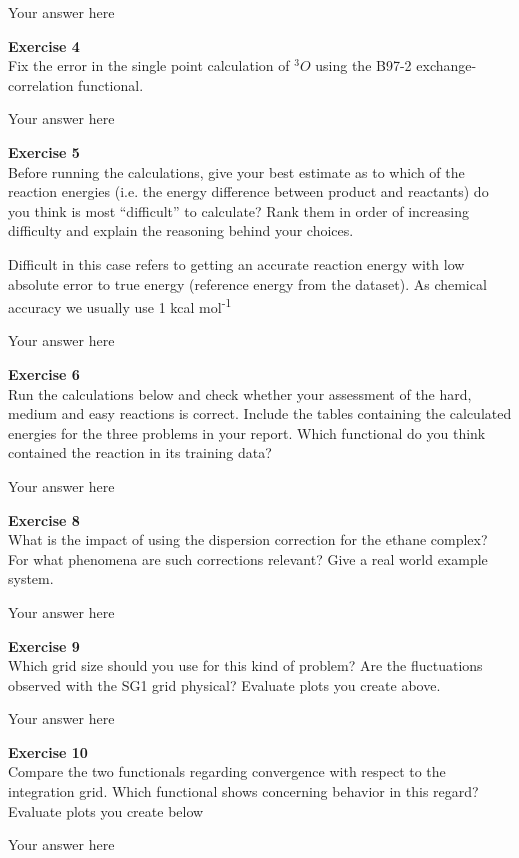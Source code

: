 \documentclass{article}
\begin{document}
Your answer here

\begin{mdframed}
\textbf{Exercise 4}\\
Fix the error in the single point calculation of  $^3 O$ using the B97-2 exchange-correlation functional.
\end{mdframed}

Your answer here

\begin{mdframed}
\textbf{Exercise 5}\\
Before running the calculations, give your best estimate as to which of the reaction energies (i.e. the energy difference between product and reactants) do you think is most ``difficult'' to calculate? Rank them in order of increasing difficulty and explain the reasoning behind your choices.

Difficult in this case refers to getting an accurate reaction energy with low absolute error to true energy (reference energy from the dataset). As chemical accuracy we usually use 1 kcal mol\textsuperscript{-1}
\end{mdframed}

Your answer here

\begin{mdframed}
\textbf{Exercise 6}\\
Run the calculations below and check whether your assessment of the hard, medium and easy reactions is correct. Include the tables containing the calculated energies for the three problems in your report. Which functional do you think contained the reaction in its training data?
\end{mdframed}

Your answer here

\begin{mdframed}
\textbf{Exercise 8}\\
What is the impact of using the dispersion correction for the ethane complex? For what phenomena are such corrections relevant? Give a real world example system.
\end{mdframed}

Your answer here

\begin{mdframed}
\textbf{Exercise 9}\\
Which grid size should you use for this kind of problem? Are the fluctuations observed with the SG1 grid physical? Evaluate plots you create above.
\end{mdframed}

Your answer here

\begin{mdframed}
\textbf{Exercise 10}\\
Compare the two functionals regarding convergence with respect to the integration grid. Which functional shows concerning behavior in this regard? Evaluate plots you create below
\end{mdframed}

Your answer here

\end{document}
